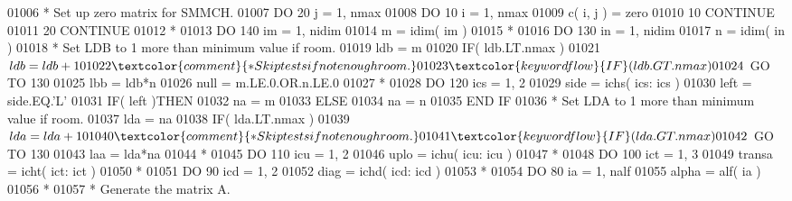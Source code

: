\begin{DoxyCode}
01006 \textcolor{comment}{*     Set up zero matrix for SMMCH.}
01007       \textcolor{keywordflow}{DO} 20 j = 1, nmax
01008          \textcolor{keywordflow}{DO} 10 i = 1, nmax
01009             c( i, j ) = zero
01010    10    \textcolor{keywordflow}{CONTINUE}
01011    20 \textcolor{keywordflow}{CONTINUE}
01012 \textcolor{comment}{*}
01013       \textcolor{keywordflow}{DO} 140 im = 1, nidim
01014          m = idim( im )
01015 \textcolor{comment}{*}
01016          \textcolor{keywordflow}{DO} 130 in = 1, nidim
01017             n = idim( in )
01018 \textcolor{comment}{*           Set LDB to 1 more than minimum value if room.}
01019             ldb = m
01020             \textcolor{keywordflow}{IF}( ldb.LT.nmax )
01021      $         ldb = ldb + 1
01022 \textcolor{comment}{*           Skip tests if not enough room.}
01023             \textcolor{keywordflow}{IF}( ldb.GT.nmax )
01024      $         \textcolor{keywordflow}{GO TO} 130
01025             lbb = ldb*n
01026             null = m.LE.0.OR.n.LE.0
01027 \textcolor{comment}{*}
01028             \textcolor{keywordflow}{DO} 120 ics = 1, 2
01029                side = ichs( ics: ics )
01030                left = side.EQ.\textcolor{stringliteral}{'L'}
01031                \textcolor{keywordflow}{IF}( left )\textcolor{keywordflow}{THEN}
01032                   na = m
01033                \textcolor{keywordflow}{ELSE}
01034                   na = n
01035 \textcolor{keywordflow}{               END IF}
01036 \textcolor{comment}{*              Set LDA to 1 more than minimum value if room.}
01037                lda = na
01038                \textcolor{keywordflow}{IF}( lda.LT.nmax )
01039      $            lda = lda + 1
01040 \textcolor{comment}{*              Skip tests if not enough room.}
01041                \textcolor{keywordflow}{IF}( lda.GT.nmax )
01042      $            \textcolor{keywordflow}{GO TO} 130
01043                laa = lda*na
01044 \textcolor{comment}{*}
01045                \textcolor{keywordflow}{DO} 110 icu = 1, 2
01046                   uplo = ichu( icu: icu )
01047 \textcolor{comment}{*}
01048                   \textcolor{keywordflow}{DO} 100 ict = 1, 3
01049                      transa = icht( ict: ict )
01050 \textcolor{comment}{*}
01051                      \textcolor{keywordflow}{DO} 90 icd = 1, 2
01052                         diag = ichd( icd: icd )
01053 \textcolor{comment}{*}
01054                         \textcolor{keywordflow}{DO} 80 ia = 1, nalf
01055                            alpha = alf( ia )
01056 \textcolor{comment}{*}
01057 \textcolor{comment}{*                          Generate the matrix A.}

\end{DoxyCode}
